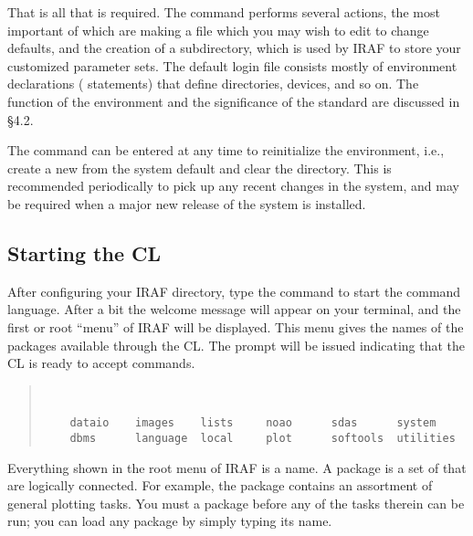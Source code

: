 \noindent
That is all that is required.  The  command performs
several actions, the most important of which are making a
 file which you may wish to edit to change defaults,
and the creation of a  subdirectory, which is used
by IRAF to store your customized parameter sets.
The default login file consists mostly of environment declarations
( statements) that define directories, devices, and so on.
The function of the environment and the significance of the 
standard  are discussed in \S 4.2.

The  command can be entered at any time to reinitialize
the environment, i.e., create a new  from the system
default and clear the  directory.  This is recommended
periodically to pick up any recent changes in the system, and may be
required when a major new release of the system is installed.

\subsection{Starting the CL}

\ppind
After configuring your IRAF directory, type the command 
to start the command language.  After a bit the welcome message
will appear on your terminal, and the first or root ``menu'' of IRAF will 
be displayed. This menu gives the names of the packages available through
the CL. The  prompt will be issued indicating that the
CL is ready to accept commands.

\begin{quotation}
\begin{center}
\\
\smallskip
\end{center}
\begin{verbatim}
    dataio    images    lists     noao      sdas      system
    dbms      language  local     plot      softools  utilities
\end{verbatim}
\end{quotation}

Everything shown in the root menu of IRAF is a  name.
A package is a set of  that are logically connected.
For example, the  package contains an assortment of
general plotting tasks.  You must  a package before any of the
tasks therein can be run; you can load any package by simply typing its name.

